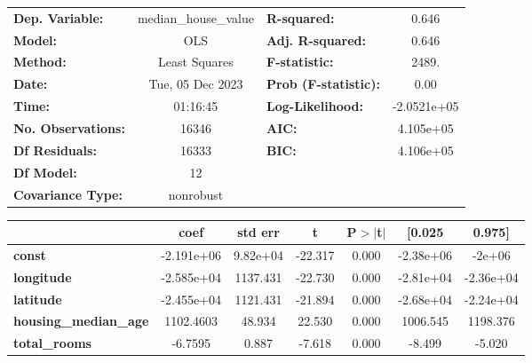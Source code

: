 \begin{center}
\begin{tabular}{lclc}
\toprule
\textbf{Dep. Variable:}               & median\_house\_value & \textbf{  R-squared:         } &      0.646   \\
\textbf{Model:}                       &         OLS          & \textbf{  Adj. R-squared:    } &      0.646   \\
\textbf{Method:}                      &    Least Squares     & \textbf{  F-statistic:       } &      2489.   \\
\textbf{Date:}                        &   Tue, 05 Dec 2023   & \textbf{  Prob (F-statistic):} &      0.00    \\
\textbf{Time:}                        &       01:16:45       & \textbf{  Log-Likelihood:    } & -2.0521e+05  \\
\textbf{No. Observations:}            &         16346        & \textbf{  AIC:               } &  4.105e+05   \\
\textbf{Df Residuals:}                &         16333        & \textbf{  BIC:               } &  4.106e+05   \\
\textbf{Df Model:}                    &            12        & \textbf{                     } &              \\
\textbf{Covariance Type:}             &      nonrobust       & \textbf{                     } &              \\
\bottomrule
\end{tabular}
\begin{tabular}{lcccccc}
                                      & \textbf{coef} & \textbf{std err} & \textbf{t} & \textbf{P$> |$t$|$} & \textbf{[0.025} & \textbf{0.975]}  \\
\midrule
\textbf{const}                        &   -2.191e+06  &     9.82e+04     &   -22.317  &         0.000        &    -2.38e+06    &       -2e+06     \\
\textbf{longitude}                    &   -2.585e+04  &     1137.431     &   -22.730  &         0.000        &    -2.81e+04    &    -2.36e+04     \\
\textbf{latitude}                     &   -2.455e+04  &     1121.431     &   -21.894  &         0.000        &    -2.68e+04    &    -2.24e+04     \\
\textbf{housing\_median\_age}         &    1102.4603  &       48.934     &    22.530  &         0.000        &     1006.545    &     1198.376     \\
\textbf{total\_rooms}                 &      -6.7595  &        0.887     &    -7.618  &         0.000        &       -8.499    &       -5.020     \\

\end{tabular}
\end{center}
